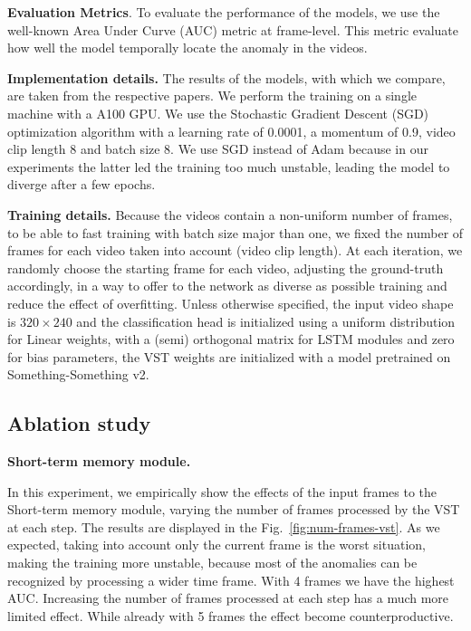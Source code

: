 \noindent\textbf{Evaluation Metrics}.
To evaluate the performance of the models, we use the well-known Area Under Curve (AUC) metric at frame-level.
This metric evaluate how well the model temporally locate the anomaly in the videos. 

\noindent\textbf{Implementation details.}
The results of the models, with which we compare, are taken from the respective papers.
We perform the training on a single machine with a A100 GPU.
We use the Stochastic Gradient Descent (SGD) optimization algorithm with a learning rate of 0.0001, a momentum of 0.9, video clip length 8 and batch size 8.
We use SGD instead of Adam because in our experiments the latter led the training too much unstable, leading the model to diverge after a few epochs.

\noindent\textbf{Training details.}
Because the videos contain a non-uniform number of frames, to be able to fast training with batch size major than one, we fixed the number of frames for each video taken into account (video clip length).
At each iteration, we randomly choose the starting frame for each video, adjusting the ground-truth accordingly, in a way to offer to the network as diverse as possible training and reduce the effect of overfitting.
Unless otherwise specified, the input video shape is $320 \times 240$ and the classification head is initialized using a uniform distribution for Linear weights, with a (semi) orthogonal matrix for LSTM modules and zero for bias parameters, the VST weights are initialized with a model pretrained on Something-Something v2.

\subsection{Ablation study}


\noindent\textbf{Short-term memory module.}

In this experiment, we empirically show the effects of the input frames to the Short-term memory module, varying the number of frames processed by the VST at each step.
The results are displayed in the Fig.~\ref{fig:num-frames-vst}.
As we expected, taking into account only the current frame is the worst situation, making the training more unstable, because most of the anomalies can be recognized by processing a wider time frame.
With 4 frames we have the highest AUC.
Increasing the number of frames processed at each step has a much more limited effect.
While already with 5 frames the effect become counterproductive.

